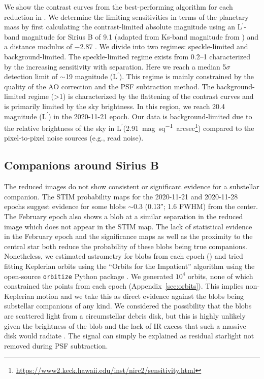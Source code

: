 \documentclass[twocolumn,linenumbers]{aastex631}
\newcommand\Lp{$\mathrm{L}^\prime$}
\begin{document}
We show the contrast curves from the best-performing algorithm for each reduction in . We determine the limiting sensitivities in terms of the planetary mass by first calculating the contrast-limited absolute magnitude using an \Lp-band magnitude for Sirius B of 9.1 (adapted from Ks-band magnitude from \citealp{bonnet-bidaudADONISHighContrast2008a}) and a distance modulus of \num{-2.87} \citep{gaiacollaborationGaiaEarlyData2021}. We divide  into two regimes: speckle-limited and background-limited. The speckle-limited regime exists from \qtyrange{0.2}{1}{\au} characterized by the increasing sensitivity with separation. Here we reach a median 5$\sigma$ detection limit of $\sim$19 magnitude (\Lp). This regime is mainly constrained by the quality of the AO correction and the PSF subtraction method. The background-limited regime (\textgreater\qty{1}{\au}) is characterized by the flattening of the contrast curves and is primarily limited by the sky brightness. In this region, we reach 20.4 magnitude (\Lp) in the 2020-11-21 epoch. Our data is background-limited due to the relative brightness of the sky in \Lp (\qty{2.91}{mag\per sq. arcsec}\footnote{\url{https://www2.keck.hawaii.edu/inst/nirc2/sensitivity.html}}) compared to the pixel-to-pixel noise sources (e.g., read noise).

\subsection{Companions around Sirius B}

The reduced images do not show consistent or significant evidence for a substellar companion. The STIM probability maps for the 2020-11-21 and 2020-11-28 epochs suggest evidence for some blobs $\sim$\qty{0.3}{\au} (\ang{;;0.13}; 1.6 FWHM) from the center. The February epoch also shows a blob at a similar separation in the reduced image which does not appear in the STIM map. The lack of statistical evidence in the February epoch and the significance maps as well as the proximity to the central star both reduce the probability of these blobs being true companions. Nonetheless, we estimated astrometry for blobs from each epoch () and tried fitting Keplerian orbits using the ``Orbits for the Impatient'' algorithm \citep[OFTI;][]{bluntOrbitsImpatientBayesian2017a} using the open-source \texttt{orbitize} Python package \citep{bluntOrbitizeComprehensiveOrbitfitting2020}. We generated $10^4$ orbits, none of which constrained the points from each epoch (Appendix~\ref{sec:orbits}). This implies non-Keplerian motion and we take this as direct evidence against the blobs being substellar companions of any kind. We considered the possibility that the blobs are scattered light from a circumstellar debris disk, but this is highly unlikely given the brightness of the blob and the lack of IR excess that such a massive disk would radiate \citep{skemerSiriusImagedMidinfrared2011}. The signal can simply be explained as residual starlight not removed during PSF subtraction.
\end{document}
